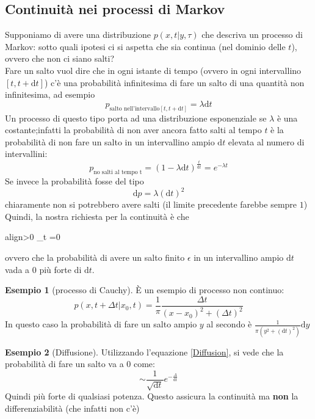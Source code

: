 \documentclass[a4paper,12pt]{article}
\newcommand{\boxedeq}[2]{\begin{empheq}[box={\fboxsep=6pt\fbox}]{align}\label{#1}#2\end{empheq}}
\theoremstyle{plain}
\theoremstyle{definition}
\newtheorem{exmp}{Esempio}[section]
\newcommand{\f}[2]{\frac{#1}{#2}}
\renewcommand{\d}{\text{d}}
\newcommand{\argg}[1]{\left(#1\right)}
\theoremstyle{remark}
\begin{document}
\subsection{Continuità nei processi di Markov}
Supponiamo di avere una distribuzione $p(x,t|y,\tau)$ che descriva un processo di Markov: sotto quali ipotesi ci si aspetta che sia continua (nel dominio delle $t$), ovvero che non ci siano salti?\\
Fare un salto vuol dire che in ogni istante di tempo (ovvero in ogni intervallino $[t,t+\d t]$) c'è una probabilità infinitesima di fare un salto di una quantità non infinitesima, ad esempio
\[p_{\text{salto nell'intervallo} [t,t+\d t]}=\lambda	\d t	\]
Un processo di questo tipo porta ad una distribuzione esponenziale se $\lambda$ è una costante;infatti la probabilità di non aver ancora fatto salti al tempo $t$ è la probabilità di non fare un salto in un intervallino ampio $\d t$ elevata al numero di intervallini:
\[p_\text{no salti al tempo t}=\left(1-\lambda\d t\right)^{\f{t}{\d t}}=e^{-\lambda t}			\]
Se invece la probabilità fosse del tipo
\[\d p=\lambda(\d t)^2		\]
chiaramente non si potrebbero avere salti (il limite precedente farebbe sempre $1$)\\
Quindi, la nostra richiesta per la continuità è che 
\boxedeq{ContinuityM}{\forall\epsilon>0\:\:	\lim_{\d t\rightarrow0}	\f{p(x+\epsilon,t+\d t|x,t)}{\d t}=0		}
ovvero che la probabilità di avere un salto finito $\epsilon$ in un intervallino ampio $\d t$ vada a 0 più forte di $\d t$.
\begin{exmp}[processo di Cauchy]
	È un esempio di processo non continuo:
	\[p\argg{x,t+\Delta t|x_0,t}=\f{1}{\pi}\f{\Delta t}{(x-x_0)^2+(\Delta t)^2}		\]
	In questo caso la probabilità di fare un salto ampio $y$ al secondo è $\f{1}{\pi\left(y^2+(\d t)^2\right)}\d y$
	
\end{exmp}
\begin{exmp}[Diffusione]
Utilizzando l'equazione \ref{Diffusion}, si vede che la probabilità di fare un salto va a 0 come:
\[\sim\f{1}{\sqrt{\d t}}e^{-\f{A}{\d t }}\]
Quindi più forte di qualsiasi potenza. Questo assicura la continuità ma \textbf{non} la differenziabilità (che infatti non c'è)
\end{exmp}
\end{document}
